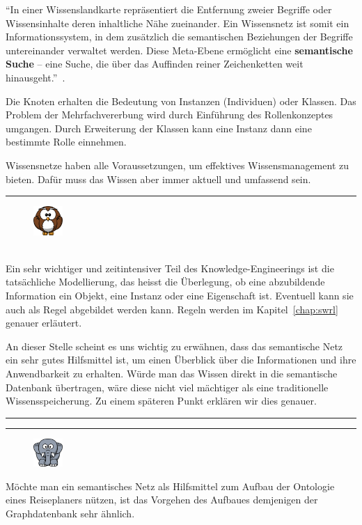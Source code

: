 ``In einer Wissenslandkarte repräsentiert die Entfernung zweier Begriffe oder Wissensinhalte deren inhaltliche Nähe zueinander. Ein Wissensnetz ist somit ein Informationssystem, in dem zusätzlich die semantischen Beziehungen der Begriffe untereinander verwaltet werden. Diese Meta-Ebene ermöglicht eine \textbf{semantische Suche} – eine Suche, die über das Auffinden reiner Zeichenketten weit hinausgeht.''~\cite[S. 89]{laemmel}.

Die Knoten erhalten die Bedeutung von Instanzen (Individuen) oder Klassen. Das Problem der Mehrfachvererbung wird durch Einführung des Rollenkonzeptes umgangen. Durch Erweiterung der Klassen kann eine Instanz dann eine bestimmte Rolle einnehmen.

Wissensnetze haben alle Voraussetzungen, um effektives Wissensmanagement zu bieten. Dafür muss das Wissen aber immer aktuell und umfassend sein.

\newpage

\noindent\rule[1ex]{\textwidth}{1pt}
\begin{figure}
    \vspace{-2pt}
    \includegraphics[width=0.1\textwidth]{bilder/owl.png}
\end{figure}\\
Ein sehr wichtiger und zeitintensiver Teil des Knowledge-Engineerings ist die tatsächliche Modellierung, das heisst die Überlegung, ob eine abzubildende Information ein Objekt, eine Instanz oder eine Eigenschaft ist. Eventuell kann sie auch als Regel abgebildet werden kann. Regeln werden im Kapitel~\ref{chap:swrl}  genauer erläutert.

An dieser Stelle scheint es uns wichtig zu erwähnen, dass das semantische Netz ein sehr gutes Hilfsmittel ist, um einen Überblick über die Informationen und ihre Anwendbarkeit zu erhalten. Würde man das Wissen direkt in die semantische Datenbank übertragen, wäre diese nicht viel mächtiger als eine traditionelle Wissensspeicherung. Zu einem späteren Punkt erklären wir dies genauer.

\noindent\rule[1ex]{\textwidth}{1pt}


\noindent\rule[1ex]{\textwidth}{1pt}
\begin{figure}
    \vspace{-12pt}
    \includegraphics[width=0.1\textwidth]{bilder/elephant.png}
\end{figure}
Möchte man ein semantisches Netz als Hilfsmittel zum Aufbau der Ontologie eines Reiseplaners nützen, ist das Vorgehen des Aufbaues demjenigen der Graphdatenbank sehr ähnlich.

